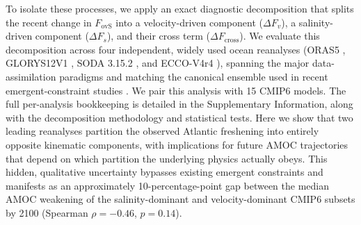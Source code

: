 \documentclass[11pt,a4paper]{article}
\begin{document}
To isolate these processes, we apply an exact diagnostic decomposition that splits the recent change in \(F_{\mathrm{ovS}}\) into a velocity-driven component (\(\Delta F_v\)), a salinity-driven component (\(\Delta F_s\)), and their cross term (\(\Delta F_{\mathrm{cross}}\)). We evaluate this decomposition across four independent, widely used ocean reanalyses (ORAS5 \citep{Zuo2019}, GLORYS12V1 \citep{Lellouche2021}, SODA 3.15.2 \citep{Carton2018}, and ECCO-V4r4 \citep{Forget2015}), spanning the major data-assimilation paradigms and matching the canonical ensemble used in recent emergent-constraint studies \citep{Portmann2026}. We pair this analysis with 15 CMIP6 models. The full per-analysis bookkeeping is detailed in the Supplementary Information, along with the decomposition methodology and statistical tests. Here we show that two leading reanalyses partition the observed Atlantic freshening into entirely opposite kinematic components, with implications for future AMOC trajectories that depend on which partition the underlying physics actually obeys. This hidden, qualitative uncertainty bypasses existing emergent constraints and manifests as an approximately 10-percentage-point gap between the median AMOC weakening of the salinity-dominant and velocity-dominant CMIP6 subsets by 2100 (Spearman $\rho = -0.46$, $p = 0.14$).
\end{document}
